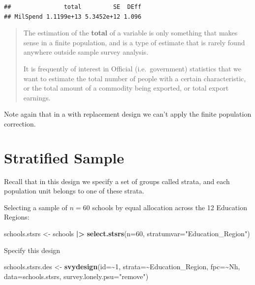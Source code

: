 \documentclass[
]{book}
\newenvironment{Shaded}{\begin{snugshade}}{\end{snugshade}}
\newcommand{\AttributeTok}[1]{\textcolor[rgb]{0.13,0.29,0.53}{#1}}
\newcommand{\DecValTok}[1]{\textcolor[rgb]{0.00,0.00,0.81}{#1}}
\newcommand{\FunctionTok}[1]{\textcolor[rgb]{0.13,0.29,0.53}{\textbf{#1}}}
\newcommand{\NormalTok}[1]{#1}
\newcommand{\OtherTok}[1]{\textcolor[rgb]{0.56,0.35,0.01}{#1}}
\newcommand{\SpecialCharTok}[1]{\textcolor[rgb]{0.81,0.36,0.00}{\textbf{#1}}}
\newcommand{\StringTok}[1]{\textcolor[rgb]{0.31,0.60,0.02}{#1}}
\begin{document}
\begin{verbatim}
##               total         SE  DEff
## MilSpend 1.1199e+13 5.3452e+12 1.096
\end{verbatim}

\begin{quote}
The estimation of the \textbf{total} of a variable is only something
that makes sense in a finite population, and is a type of estimate
that is rarely found anywhere outside sample survey analysis.

It is frequently of interest in Official (i.e.~government) statistics
that we want to estimate the total number of people with a certain characteristic,
or the total amount of a commodity being exported, or total export earnings.
\end{quote}

Note again that in a with replacement design we can't apply the finite
population correction.

\section{Stratified Sample}\label{stratified-sample}

Recall that in this design we specify a set of groups called strata, and
each population unit belongs to one of these strata.

Selecting a sample of \(n=60\) schools by equal allocation across the 12
Education Regions:

\begin{Shaded}
\begin{Highlighting}[]
\NormalTok{schools.stsrs }\OtherTok{\textless{}{-}}\NormalTok{ schools }\SpecialCharTok{|\textgreater{}} \FunctionTok{select.stsrs}\NormalTok{(}\AttributeTok{n=}\DecValTok{60}\NormalTok{, }\AttributeTok{stratumvar=}\StringTok{"Education\_Region"}\NormalTok{)}
\end{Highlighting}
\end{Shaded}

Specify this design

\begin{Shaded}
\begin{Highlighting}[]
\NormalTok{schools.stsrs.des }\OtherTok{\textless{}{-}} \FunctionTok{svydesign}\NormalTok{(}\AttributeTok{id=}\SpecialCharTok{\textasciitilde{}}\DecValTok{1}\NormalTok{, }\AttributeTok{strata=}\SpecialCharTok{\textasciitilde{}}\NormalTok{Education\_Region, }\AttributeTok{fpc=}\SpecialCharTok{\textasciitilde{}}\NormalTok{Nh,}
                               \AttributeTok{data=}\NormalTok{schools.stsrs,}
                               \AttributeTok{survey.lonely.psu=}\StringTok{"remove"}\NormalTok{)}
\end{Highlighting}
\end{Shaded}
\end{document}
